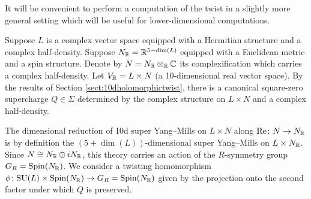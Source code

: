 \documentclass[10pt, oneside]{article}
\begin{document}
It will be convenient to perform a computation of the twist in a slightly more general setting which will be useful for lower-dimensional computations.

Suppose $L$ is a complex vector space equipped with a Hermitian structure and a complex half-density. Suppose $N_\mathbb R=\mathbb R^{5-\dim(L)}$ equipped with a Euclidean metric and a spin structure. Denote by $N=N_\mathbb R\otimes_\mathbb R\mathbb C$ its complexification which carries a complex half-density. Let $V_\mathbb R = L\times N$ (a 10-dimensional real vector space). By the results of Section \ref{sect:10dholomorphictwist}, there is a canonical square-zero supercharge $Q\in\Sigma$ determined by the complex structure on $L\times N$ and a complex half-density.

The dimensional reduction of 10d super Yang--Mills on $L\times N$ along $\mathrm{Re}\colon N\rightarrow N_\mathbb R$ is by definition the $(5+\dim(L))$-dimensional super Yang--Mills on $L\times N_\mathbb R$. Since $N\cong N_\mathbb R\oplus iN_\mathbb R$, this theory carries an action of the $R$-symmetry group $G_R=\mathrm{Spin}(N_\mathbb R)$. We consider a twisting homomorphism $\phi\colon \mathrm{SU}(L)\times \mathrm{Spin}(N_\mathbb R)\rightarrow G_R=\mathrm{Spin}(N_\mathbb R)$ given by the projection onto the second factor under which $Q$ is preserved.
\end{document}
